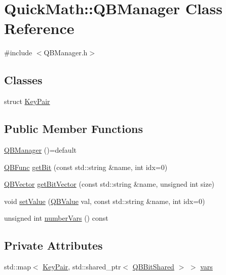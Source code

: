 \hypertarget{classQuickMath_1_1QBManager}{}\section{Quick\+Math\+:\+:Q\+B\+Manager Class Reference}
\label{classQuickMath_1_1QBManager}


{\ttfamily \#include $<$Q\+B\+Manager.\+h$>$}

\subsection*{Classes}
\begin{DoxyCompactItemize}
\item 
struct \hyperlink{structQuickMath_1_1QBManager_1_1KeyPair}{Key\+Pair}
\end{DoxyCompactItemize}
\subsection*{Public Member Functions}
\begin{DoxyCompactItemize}
\item 
\hyperlink{classQuickMath_1_1QBManager_a732b5922caec8fefe2b343adc13bc04b}{Q\+B\+Manager} ()=default
\item 
\hyperlink{classQuickMath_1_1QBFunc}{Q\+B\+Func} \hyperlink{classQuickMath_1_1QBManager_add834cd3b142721a06844a206fa1bd6d}{get\+Bit} (const std\+::string \&name, int idx=0)
\item 
\hyperlink{classQuickMath_1_1QBVector}{Q\+B\+Vector} \hyperlink{classQuickMath_1_1QBManager_ac5ce2080c5adc4d69014059f6eb6f619}{get\+Bit\+Vector} (const std\+::string \&name, unsigned int size)
\item 
void \hyperlink{classQuickMath_1_1QBManager_ab2e146d1e4e93f80d8ba832e511f7042}{set\+Value} (\hyperlink{namespaceQuickMath_aec13b08c42d9f8e688241623c8b379a0}{Q\+B\+Value} val, const std\+::string \&name, int idx=0)
\item 
unsigned int \hyperlink{classQuickMath_1_1QBManager_ad45c81146ce1daf119529be6927ce8fd}{number\+Vars} () const 
\end{DoxyCompactItemize}
\subsection*{Private Attributes}
\begin{DoxyCompactItemize}
\item 
std\+::map$<$ \hyperlink{structQuickMath_1_1QBManager_1_1KeyPair}{Key\+Pair}, std\+::shared\+\_\+ptr$<$ \hyperlink{classQuickMath_1_1QBBitShared}{Q\+B\+Bit\+Shared} $>$ $>$ \hyperlink{classQuickMath_1_1QBManager_a0c6ad5951835017e18664c9ec10f67bd}{vars}
\end{DoxyCompactItemize}


